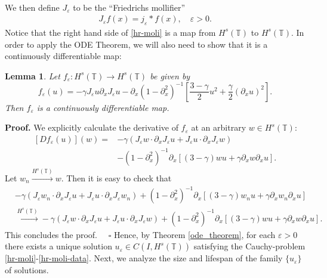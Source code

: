 \documentclass[12pt,reqno]{amsart}
\newcommand{\p}{\partial}
\newcommand{\ci}{\mathbb{T}}
\newcommand{\ee}{\varepsilon}
\theoremstyle{plain}  %
\newtheorem{lemma}{Lemma}
\theoremstyle{definition}
\begin{document}
\begin{appendices}
\begin{equation*}
\begin{split}
	\end{split}
\end{equation*}
	We then define $J_\ee$ to be the ``Friedrichs mollifier''
	\begin{equation}
		\begin{split}
			J_\ee f(x) = j_\ee * f(x), \quad \ee>0.
		\end{split}
	\end{equation}
%
%
Notice that the right hand side of \eqref{hr-moli} is a map from $H^s(\ci)$
to $H^s(\ci)$.  In order to apply the ODE Theorem, we will also need to
show that it is a continuously differentiable map:
%
\vskip0.2in





%
%
\begin{lemma}
	Let $f_\ee:H^s(\ci) \to H^s(\ci)$ be given by 
	\begin{equation}
		\label{f_ep}
		f_{\ee}(u) = -\gamma  J_\varepsilon u \partial_x J_\varepsilon u
		- \p_x (1-\p_x^2)^{-1} \left
		[\frac{3-\gamma}{2}u^2 + \frac{\gamma}{2}(\p_x u)^2 \right ].
	\end{equation}
	Then $f_\ee$  is a continuously differentiable map.
\end{lemma}
%
%
{\bf Proof.} We explicitly calculate the derivative of $f_\ee$ at an
arbitrary $w \in H^s(\ci)$:
\begin{equation*}
	\begin{split}
		[Df_{\ee}(u)](w)
		=
		& -\gamma (J_\varepsilon w \cdot \partial_x J_\varepsilon u +
		J_\varepsilon u \cdot \partial_x J_\varepsilon w)
		\\
		& - (1-\p_x ^2)^{-1}
		\p_x \left [(3-\gamma)w u + \gamma\p_x w \p_x u \right ].
	\end{split}
\end{equation*}
Let $w_n \xrightarrow{H^s(\ci)} w$. Then it is easy to check that
%
\begin{equation}
	\begin{split}
		& -\gamma (J_\varepsilon w_n \cdot \partial_x J_\varepsilon u 
		+ J_\varepsilon u \cdot \partial_x J_\varepsilon w_n)
		+ (1-\p_x ^2)^{-1}
		\p_x \left [(3-\gamma)w_n u + \gamma\p_x w_n \p_x u \right ]
		\\
		& \xrightarrow{H^s(\ci)} 
		 -\gamma (J_\varepsilon w \cdot \partial_x J_\varepsilon u 
		+ J_\varepsilon u \cdot \partial_x J_\varepsilon w) + (1-\p_x ^2)^{-1}
		\p_x \left [(3-\gamma)w u + \gamma\p_x w \p_x u \right ].
	\end{split}
\end{equation}
This concludes the proof. $\quad \square$
\vskip0.1in
Hence, by Theorem \ref{ode_theorem}, for each $\ee > 0$ there exists a
unique solution $u_\ee \in C(I, H^s(\ci))$ satisfying the Cauchy-problem
\eqref{hr-moli}-\eqref{hr-moli-data}. Next, we analyze the size and
lifespan of the family $\{u_\ee\}$ of solutions.



\end{appendices}
\end{document}

